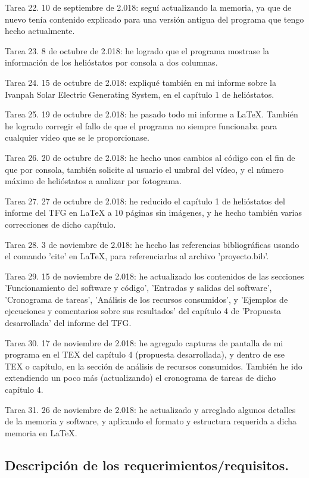 Tarea 22. 10 de septiembre de 2.018: seguí actualizando la memoria, ya que de nuevo tenía contenido explicado para una versión antigua del programa que tengo hecho actualmente.

Tarea 23. 8 de octubre de 2.018: he logrado que el programa mostrase la información de los helióstatos por consola a dos columnas.

Tarea 24. 15 de octubre de 2.018: expliqué también en mi informe sobre la Ivanpah Solar Electric Generating System, en el capítulo 1 de helióstatos.

Tarea 25. 19 de octubre de 2.018: he pasado todo mi informe a LaTeX. También he logrado corregir el fallo de que el programa no siempre funcionaba para cualquier vídeo que se le proporcionase.

Tarea 26. 20 de octubre de 2.018: he hecho unos cambios al código con el fin de que por consola, también solicite al usuario el umbral del vídeo, y el número máximo de helióstatos a analizar por fotograma.

Tarea 27. 27 de octubre de 2.018: he reducido el capítulo 1 de helióstatos del informe del TFG en LaTeX a 10 páginas sin imágenes, y he hecho también varias correcciones de dicho capítulo.

Tarea 28. 3 de noviembre de 2.018: he hecho las referencias bibliográficas usando el comando 'cite' en LaTeX, para referenciarlas al archivo 'proyecto.bib'.

Tarea 29. 15 de noviembre de 2.018: he actualizado los contenidos de las secciones 'Funcionamiento del software y código', 'Entradas y salidas del software', 'Cronograma de tareas', 'Análisis de los recursos consumidos', y 'Ejemplos de ejecuciones y comentarios sobre sus resultados' del capítulo 4 de 'Propuesta desarrollada' del informe del TFG.

Tarea 30. 17 de noviembre de 2.018: he agregado capturas de pantalla de mi programa en el TEX del capítulo 4 (propuesta desarrollada), y dentro de ese TEX o capítulo, en la sección de análisis de recursos consumidos. También he ido extendiendo un poco más (actualizando) el cronograma de tareas de dicho capítulo 4.

Tarea 31. 26 de noviembre de 2.018: he actualizado y arreglado algunos detalles de la memoria y software, y aplicando el formato y estructura requerida a dicha memoria en LaTeX.

\subsection{Descripción de los requerimientos/requisitos.}

